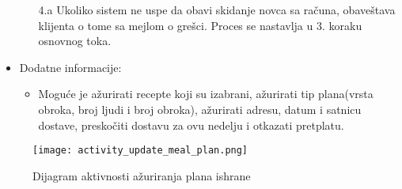 \begin{itemize}
\begin{itemize}
            \item[4.a] Ukoliko sistem ne uspe da obavi skidanje novca sa računa, obaveštava klijenta o tome sa mejlom o grešci. Proces se nastavlja u 3. koraku osnovnog toka.
        \end{itemize}
    \item Dodatne informacije:
        \begin{itemize}
            \item Moguće je ažurirati recepte koji su izabrani, ažurirati tip plana(vrsta obroka, broj ljudi i broj obroka), ažurirati adresu, datum i satnicu dostave, preskočiti dostavu za ovu nedelju i otkazati pretplatu. 
        \end{itemize}
\end{itemize}

\begin{figure}[H]
\begin{center}
\texttt{[image: activity\_update\_meal\_plan.png]}
\end{center}
    \caption{Dijagram aktivnosti ažuriranja plana ishrane}
\label{fig:ActivityUpdateMealPlan}
\end{figure}
